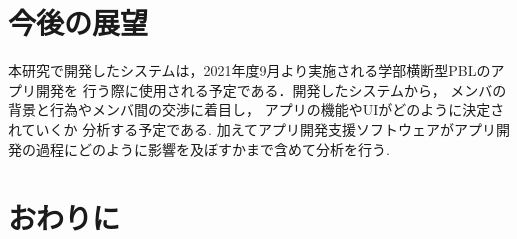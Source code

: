 \documentclass[submit,techrep]{ipsj}
\begin{document}
\section{今後の展望}

本研究で開発したシステムは，2021年度9月より実施される学部横断型PBLのアプリ開発を
行う際に使用される予定である．開発したシステムから，
メンバの背景と行為やメンバ間の交渉に着目し，
アプリの機能やUIがどのように決定されていくか 分析する予定である.
加えてアプリ開発支援ソフトウェアがアプリ開発の過程にどのように影響を及ぼすかまで含めて分析を行う.


\section{おわりに}

\end{document}
